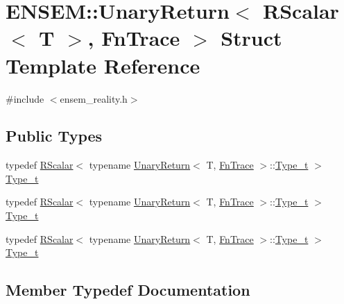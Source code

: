 \hypertarget{structENSEM_1_1UnaryReturn_3_01RScalar_3_01T_01_4_00_01FnTrace_01_4}{}\section{E\+N\+S\+EM\+:\+:Unary\+Return$<$ R\+Scalar$<$ T $>$, Fn\+Trace $>$ Struct Template Reference}
\label{structENSEM_1_1UnaryReturn_3_01RScalar_3_01T_01_4_00_01FnTrace_01_4}


{\ttfamily \#include $<$ensem\+\_\+reality.\+h$>$}

\subsection*{Public Types}
\begin{DoxyCompactItemize}
\item 
typedef \mbox{\hyperlink{classENSEM_1_1RScalar}{R\+Scalar}}$<$ typename \mbox{\hyperlink{structENSEM_1_1UnaryReturn}{Unary\+Return}}$<$ T, \mbox{\hyperlink{structENSEM_1_1FnTrace}{Fn\+Trace}} $>$\+::\mbox{\hyperlink{structENSEM_1_1UnaryReturn_3_01RScalar_3_01T_01_4_00_01FnTrace_01_4_a1fbf2ac97cda49c4f5347aa1df4559aa}{Type\+\_\+t}} $>$ \mbox{\hyperlink{structENSEM_1_1UnaryReturn_3_01RScalar_3_01T_01_4_00_01FnTrace_01_4_a1fbf2ac97cda49c4f5347aa1df4559aa}{Type\+\_\+t}}
\item 
typedef \mbox{\hyperlink{classENSEM_1_1RScalar}{R\+Scalar}}$<$ typename \mbox{\hyperlink{structENSEM_1_1UnaryReturn}{Unary\+Return}}$<$ T, \mbox{\hyperlink{structENSEM_1_1FnTrace}{Fn\+Trace}} $>$\+::\mbox{\hyperlink{structENSEM_1_1UnaryReturn_3_01RScalar_3_01T_01_4_00_01FnTrace_01_4_a1fbf2ac97cda49c4f5347aa1df4559aa}{Type\+\_\+t}} $>$ \mbox{\hyperlink{structENSEM_1_1UnaryReturn_3_01RScalar_3_01T_01_4_00_01FnTrace_01_4_a1fbf2ac97cda49c4f5347aa1df4559aa}{Type\+\_\+t}}
\item 
typedef \mbox{\hyperlink{classENSEM_1_1RScalar}{R\+Scalar}}$<$ typename \mbox{\hyperlink{structENSEM_1_1UnaryReturn}{Unary\+Return}}$<$ T, \mbox{\hyperlink{structENSEM_1_1FnTrace}{Fn\+Trace}} $>$\+::\mbox{\hyperlink{structENSEM_1_1UnaryReturn_3_01RScalar_3_01T_01_4_00_01FnTrace_01_4_a1fbf2ac97cda49c4f5347aa1df4559aa}{Type\+\_\+t}} $>$ \mbox{\hyperlink{structENSEM_1_1UnaryReturn_3_01RScalar_3_01T_01_4_00_01FnTrace_01_4_a1fbf2ac97cda49c4f5347aa1df4559aa}{Type\+\_\+t}}
\end{DoxyCompactItemize}


\subsection{Member Typedef Documentation}
\mbox{\label{structENSEM_1_1UnaryReturn_3_01RScalar_3_01T_01_4_00_01FnTrace_01_4_a1fbf2ac97cda49c4f5347aa1df4559aa}} 
